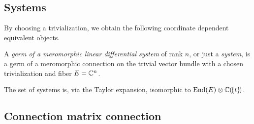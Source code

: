 \subsection{Systems}
By choosing a trivialization, we obtain the following coordinate dependent
equivalent objects.
\begin{defn}
  A \emph{germ of a meromorphic linear differential system} of rank $n$, or
  just a \emph{system}, is a germ of a meromorphic connection on the trivial
  vector bundle with a chosen trivialization and fiber $E=\mathbb{C}^n$.
\end{defn}
\begin{rem}
  The set of systems is, via the Taylor expansion\TODO{}, isomorphic to
  $\operatorname{End}(E)\otimes\mathbb{C}(\!\{t\}\!)$.
\end{rem}

\subsection{Connection matrix \rightarrow{} connection}
\begin{comment}
  There is a thm in \cite{sabbah2007isomonodromic}
\end{comment}


